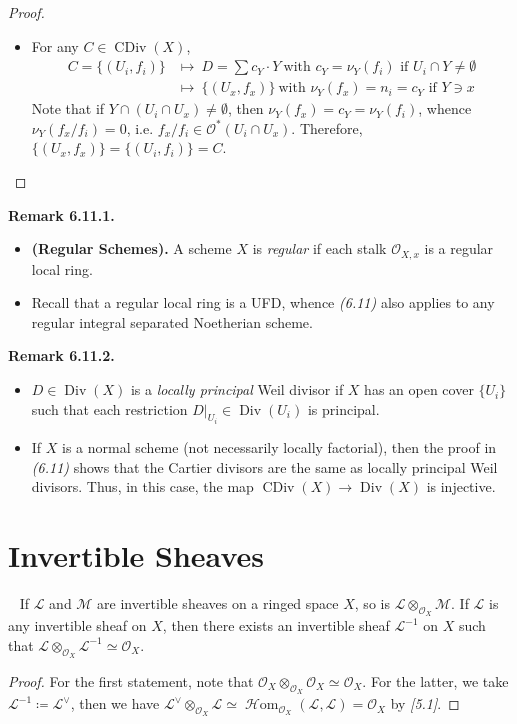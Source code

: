 \documentclass[11pt,a4paper,footinclude=true,headinclude=true]{scrbook} %
\DeclareMathOperator{\CDiv}{CDiv}
\DeclareMathOperator{\Div}{Div}
\newcommand{\LL}{\mathscr{L}}
\newcommand{\MM}{\mathscr{M}}
\newcommand{\OO}{\mathcal{O}}
\newcommand{\<}{\langle}
\newcommand{\>}{\rangle}
\DeclareMathOperator{\HHom}{\mathscr{H}om}
\newenvironment{proposition}[2][]
{\renewcommand\theinnercustomprop{#2}\innercustomprop[#1] 
\begin{mdframed}[backgroundcolor=gray!20]\ }
{\end{mdframed}\endinnercustomprop}
\newenvironment{remark}[2][Remark]
    { \begin{mdframed}[backgroundcolor=gray!20] \textbf{#1 #2.} }
    {  \end{mdframed}}
\begin{document}
\begin{proof}
\begin{itemize}
\begin{align*}
        \end{align*}
        \item For any $C\in\CDiv(X)$,
        \begin{align*}
            C=\{(U_i,f_i)\} &\longmapsto\ D=\sum c_Y\cdot Y\ \text{with $c_Y=\nu_Y(f_i)$ if $U_i\cap Y\neq\emptyset$}\\ &\longmapsto\ \{(U_x,f_x)\}\ \text{with $\nu_Y(f_x)=n_i=c_Y$ if $Y\ni x$}
        \end{align*}
        Note that if $Y\cap(U_i\cap U_x)\neq\emptyset$, then $\nu_Y(f_x)=c_Y=\nu_Y(f_i)$, whence $\nu_Y(f_x/f_i)=0$, i.e. $f_x/f_i\in\OO^\ast(U_i\cap U_x)$. Therefore, $\{(U_x,f_x)\}=\{(U_i,f_i)\}=C$.
    \end{itemize}
\end{proof}

\begin{remark}{6.11.1}
    \begin{itemize}
        \item \textbf{(Regular Schemes).} A scheme $X$ is \textit{regular} if each stalk $\OO_{X,x}$ is a regular local ring.
        \item Recall that a regular local ring is a UFD, whence \textit{(6.11)} also applies to any regular integral separated Noetherian scheme.
    \end{itemize}
\end{remark}

\begin{remark}{6.11.2}
    \begin{itemize}
        \item $D\in\Div(X)$ is a \textit{locally principal} Weil divisor if $X$ has an open cover $\{U_i\}$ such that each restriction $D|_{U_i}\in\Div(U_i)$ is principal.
        \item If $X$ is a normal scheme (not necessarily locally factorial), then the proof in \textit{(6.11)} shows that the Cartier divisors are the same as locally principal Weil divisors. Thus, in this case, the map $\CDiv(X)\to\Div(X)$ is injective.
    \end{itemize}
\end{remark}

\newpage
\section{Invertible Sheaves}
\begin{proposition}{6.12}
    If $\LL$ and $\MM$ are invertible sheaves on a ringed space $X$, so is $\LL\otimes_{\OO_X}\MM$. If $\LL$ is any invertible sheaf on $X$, then there exists an invertible sheaf $\LL^{-1}$ on $X$ such that $\LL\otimes_{\OO_X}\LL^{-1}\simeq\OO_X$.
\end{proposition}
\begin{proof}
    For the first statement, note that $\OO_X\otimes_{\OO_X}\OO_X\simeq\OO_X$. For the latter, we take $\LL^{-1}\coloneqq\LL^\vee$, then we have $\LL^\vee\otimes_{\OO_X}\LL\simeq\HHom_{\OO_X}(\LL,\LL)=\OO_X$ by \textit{[5.1]}.
\end{proof}
\end{document}
